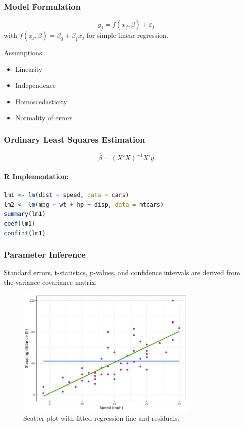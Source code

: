 \documentclass[11pt,a4paper]{article}
\begin{document}
\subsubsection{Model Formulation}
\begin{equation}
y_j = f(x_j, \beta) + \varepsilon_j
\end{equation}
with $f(x_j, \beta) = \beta_0 + \beta_1 x_j$ for simple linear regression.

\begin{notebox}
Assumptions:
\begin{itemize}
  \item Linearity
  \item Independence
  \item Homoscedasticity
  \item Normality of errors
\end{itemize}
\end{notebox}

\subsubsection{Ordinary Least Squares Estimation}
\begin{equation}
\hat{\beta} = (X'X)^{-1}X'y
\end{equation}

\paragraph{R Implementation:}
\begin{lstlisting}[language=R]
lm1 <- lm(dist ~ speed, data = cars)
lm2 <- lm(mpg ~ wt + hp + disp, data = mtcars)
summary(lm1)
coef(lm1)
confint(lm1)
\end{lstlisting}

\subsubsection{Parameter Inference}

Standard errors, t-statistics, p-values, and confidence intervals are derived from the variance-covariance matrix.

\begin{figure}[htb]
    \centering
    \includegraphics[width=0.8\textwidth]{regression-fit.png}
    \caption{Scatter plot with fitted regression line and residuals.}
    \label{fig:regression-fit}
\end{figure}
\end{document}
